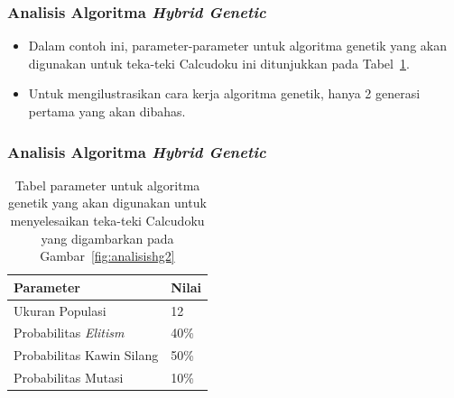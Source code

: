 \documentclass{beamer}
\begin{document}
\begin{frame}
\frametitle{Analisis Algoritma \textit{Hybrid Genetic}}
\begin{itemize}
\item Dalam contoh ini, parameter-parameter untuk algoritma genetik yang akan digunakan untuk teka-teki Calcudoku ini ditunjukkan pada Tabel~\ref{tab:analisishg1}.
\item Untuk mengilustrasikan cara kerja algoritma genetik, hanya 2 generasi pertama yang akan dibahas.
\end{itemize}
\end{frame}


\begin{frame}
\frametitle{Analisis Algoritma \textit{Hybrid Genetic}}
\begin{table}
\centering
\captionsetup{justification=centering}
\begin{tabular}{| l | l |}
\hline
Parameter & Nilai \\
\hline \hline
Ukuran Populasi & 12 \\
\hline
Probabilitas \textit{Elitism} & 40\% \\
\hline
Probabilitas Kawin Silang & 50\% \\
\hline
Probabilitas Mutasi & 10\% \\
\hline
\end{tabular}
\caption[Tabel parameter untuk algoritma genetik yang akan digunakan untuk menyelesaikan teka-teki Calcudoku yang digambarkan pada Gambar~\ref{fig:analisishg2}]{Tabel parameter untuk algoritma genetik yang akan digunakan untuk menyelesaikan teka-teki Calcudoku yang digambarkan pada Gambar~\ref{fig:analisishg2}}
\label{tab:analisishg1}
\end{table}
\end{frame}
\end{document}
